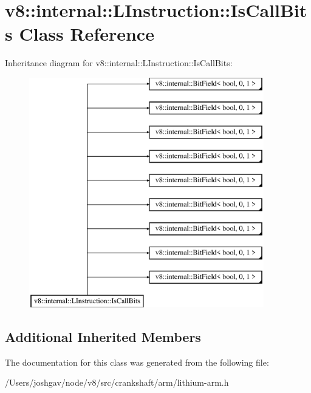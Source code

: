 \hypertarget{classv8_1_1internal_1_1_l_instruction_1_1_is_call_bits}{}\section{v8\+:\+:internal\+:\+:L\+Instruction\+:\+:Is\+Call\+Bits Class Reference}
\label{classv8_1_1internal_1_1_l_instruction_1_1_is_call_bits}
Inheritance diagram for v8\+:\+:internal\+:\+:L\+Instruction\+:\+:Is\+Call\+Bits\+:\begin{figure}[H]
\begin{center}
\leavevmode
\includegraphics[height=10.000000cm]{classv8_1_1internal_1_1_l_instruction_1_1_is_call_bits}
\end{center}
\end{figure}
\subsection*{Additional Inherited Members}


The documentation for this class was generated from the following file\+:\begin{DoxyCompactItemize}
\item 
/\+Users/joshgav/node/v8/src/crankshaft/arm/lithium-\/arm.\+h\end{DoxyCompactItemize}
